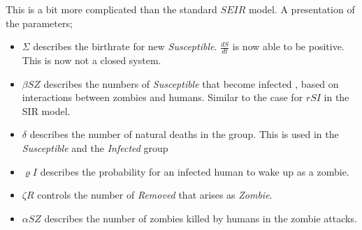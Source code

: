 \documentclass[%
twoside,                 %
final,                   %
chapterprefix=true,      %
open=right               %
10pt]{book}
\begin{document}
This is a bit more complicated than the standard $SEIR$ model. A presentation of the parameters;
\begin{itemize}
\item $\Sigma$ describes the birthrate for new \emph{Susceptible}. $\frac{dS}{dt}$ is now able to be positive. This is now not a closed system. 

\item $\beta SZ$ describes the numbers of \emph{Susceptible} that become infected , based on interactions between zombies and humans. Similar to the case for $rSI$ in the SIR model. 

\item $\delta$ describes the number of natural deaths in the group. This is used in the \emph{Susceptible} and the \emph{Infected} group

\item $\varrho I$ describes the probability for an infected human to wake up as a zombie.

\item $\zeta R$ controls the number of \emph{Removed} that arises as \emph{Zombie}. 

\item $\alpha SZ$ describes the number of zombies killed by humans in the zombie attacks. 
\end{itemize}
\end{document}
